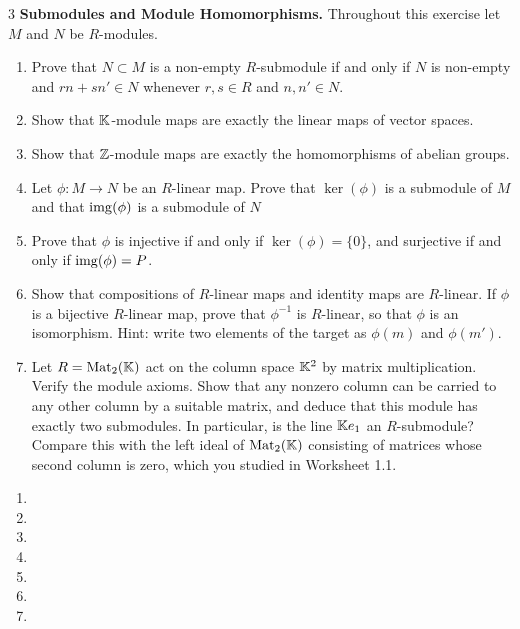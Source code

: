 \documentclass[Notebook.tex]{subfiles}
\begin{document}
\begin{problem}{3}\label{m:maps}
	\textbf{Submodules and Module Homomorphisms.} Throughout this exercise let $M$ and $N$ be $R$-modules.
	\begin{enumerate}[label=(\alph*),ref=\theenumi\alph*]
		\item Prove that $N \subset M$ is a non-empty $R$-submodule if and only if $N$ is non-empty and $rn+sn'\in N$ whenever $r,s\in R$ and $n,n'\in N$.
		\item Show that $\mathbb K$-module maps are exactly the linear maps of vector spaces.
		\item Show that $\mathbb Z$-module maps are exactly the homomorphisms of abelian groups.
		\item Let $\phi:M\to N$ be an $R$-linear map. Prove that $\ker(\phi)$ is a submodule of $M$ and that $\operatorname{img}(\phi)$ is a submodule of $N$
		\item Prove that $\phi$ is injective if and only if $\ker(\phi)=\{0\}$, and surjective if and only if $\operatorname{img}(\phi)=P$.
		\item Show that compositions of $R$-linear maps and identity maps are $R$-linear. If $\phi$ is a bijective $R$-linear map, prove that $\phi^{-1}$ is $R$-linear, so that $\phi$ is an isomorphism. Hint: write two elements of the target as $\phi(m)$ and $\phi(m')$.
		\item Let $R=\operatorname{Mat}_2(\mathbb K)$ act on the column space $\mathbb K^2$ by matrix multiplication. Verify the module axioms. Show that any nonzero column can be carried to any other column by a suitable matrix, and deduce that this module has exactly two submodules. In particular, is the line $\mathbb K e_1$ an $R$-submodule? Compare this with the left ideal of $\operatorname{Mat}_2(\mathbb K)$ consisting of matrices whose second column is zero, which you studied in Worksheet 1.1.
	\end{enumerate}
\end{problem}

\begin{solution}
	\bbni
	\begin{enumerate}[label=(\alph*),ref=\theenumi\alph*]
		\item
		\item
		\item
		\item
		\item
		\item
		\item
	\end{enumerate}
\end{solution}
\end{document}
